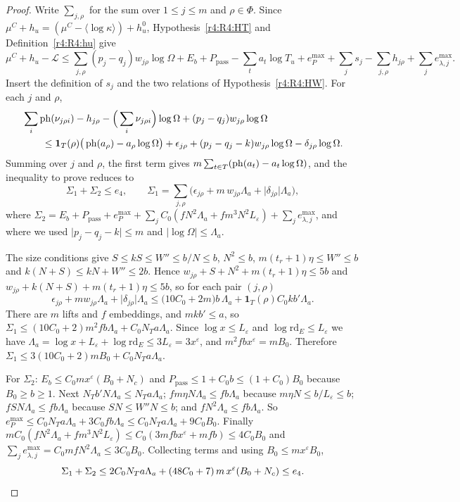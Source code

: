 \begin{proof}
Write $\sum_{j,\rho}$ for the sum over $1\le j\le m$ and $\rho\in\Phi$. Since $\mu^C+h_u=(\mu^C-\langle\log\kappa\rangle)+h^0_u$, Hypothesis~\ref{r4:R4:HT} and Definition~\ref{r4:R4:hu} give
\[
\mu^C+h_u-\mathcal L\le\sum_{j,\rho}(p_j-q_j)w_{j\rho}\log\Omega+E_b+P_{\mathrm{pass}}-\sum_ta_t\log T_u+e_P^{\max}+\sum_j s_j-\sum_{j,\rho}h_{j\rho}+\sum_je^{\max}_{\lambda,j}.
\] Insert the definition of $s_j$ and the two relations of Hypothesis~\ref{r4:R4:HW}. For each $j$ and $\rho$,
\begin{align*}
&\sum_i\operatorname{ph}(\nu_{j\rho i})-h_{j\rho}-\Big(\sum_i\nu_{j\rho i}\Big)\log\Omega+(p_j-q_j)w_{j\rho}\log\Omega\\
&\qquad\le\mathbf 1_T(\rho)\big(\operatorname{ph}(a_\rho)-a_\rho\log\Omega\big)+\epsilon_{j\rho}+(p_j-q_j-k)w_{j\rho}\log\Omega-\delta_{j\rho}\log\Omega .
\end{align*}
Summing over $j$ and $\rho$, the first term gives $m\sum_{t\in T}(\operatorname{ph}(a_t)-a_t\log\Omega)$, and the inequality to prove reduces to
\[
\Sigma_1+\Sigma_2\le e_4,\qquad \Sigma_1=\sum_{j,\rho}\big(\epsilon_{j\rho}+m\,w_{j\rho}\Lambda_a+\lvert\delta_{j\rho}\rvert\Lambda_a\big),
\]
where $\Sigma_2=E_b+P_{\mathrm{pass}}+e_P^{\max}+\sum_jC_0(fN^2\Lambda_a+fm^3N^2L_\varepsilon)+\sum_je^{\max}_{\lambda,j}$, and where we used $\lvert p_j-q_j-k\rvert\le m$ and $\lvert\log\Omega\rvert\le\Lambda_a$.

The size conditions give $S\le kS\le W''\le b/N\le b$, $N^2\le b$, $m(t_r+1)\eta\le W''\le b$ and $k(N+S)\le kN+W''\le2b$. Hence $w_{j\rho}+S+N^2+m(t_r+1)\eta\le5b$ and $w_{j\rho}+k(N+S)+m(t_r+1)\eta\le5b$, so for each pair $(j,\rho)$
\[
\epsilon_{j\rho}+mw_{j\rho}\Lambda_a+\lvert\delta_{j\rho}\rvert\Lambda_a\le\big(10C_0+2m\big)b\,\Lambda_a+\mathbf 1_T(\rho)C_0kb'\Lambda_a .
\]
There are $m$ lifts and $f$ embeddings, and $mkb'\le a$, so $\Sigma_1\le(10C_0+2)m^2fb\Lambda_a+C_0N_Ta\Lambda_a$. Since $\log x\le L_\varepsilon$ and $\log\mathrm{rd}_E\le L_\varepsilon$ we have $\Lambda_a=\log x+L_\varepsilon+\log\mathrm{rd}_E\le3L_\varepsilon=3x^\varepsilon$, and $m^2fbx^\varepsilon=mB_0$. Therefore $\Sigma_1\le3(10C_0+2)mB_0+C_0N_Ta\Lambda_a$.

For $\Sigma_2$: $E_b\le C_0mx^\varepsilon(B_0+N_c)$ and $P_{\mathrm{pass}}\le1+C_0b\le(1+C_0)B_0$ because $B_0\ge b\ge1$. Next $N_Tb'N\Lambda_a\le N_Ta\Lambda_a$; $fm\eta N\Lambda_a\le fb\Lambda_a$ because $m\eta N\le b/L_\varepsilon\le b$; $fSN\Lambda_a\le fb\Lambda_a$ because $SN\le W''N\le b$; and $fN^2\Lambda_a\le fb\Lambda_a$. So $e_P^{\max}\le C_0N_Ta\Lambda_a+3C_0fb\Lambda_a\le C_0N_Ta\Lambda_a+9C_0B_0$. Finally $mC_0(fN^2\Lambda_a+fm^3N^2L_\varepsilon)\le C_0(3mfbx^\varepsilon+mfb)\le4C_0B_0$ and $\sum_je^{\max}_{\lambda,j}=C_0mfN^2\Lambda_a\le3C_0B_0$. Collecting terms and using $B_0\le mx^\varepsilon B_0$,
\[
\Sigma_1+\Sigma_2\le2C_0N_Ta\Lambda_a+(48C_0+7)\,m\,x^\varepsilon(B_0+N_c)\le e_4 .\qedhere
\]
\end{proof}

